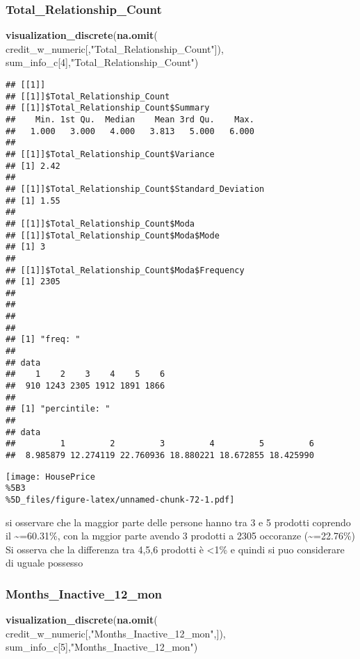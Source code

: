 \documentclass[
]{article}
\newenvironment{Shaded}{\begin{snugshade}}{\end{snugshade}}
\newcommand{\DecValTok}[1]{\textcolor[rgb]{0.00,0.00,0.81}{#1}}
\newcommand{\FunctionTok}[1]{\textcolor[rgb]{0.13,0.29,0.53}{\textbf{#1}}}
\newcommand{\NormalTok}[1]{#1}
\newcommand{\StringTok}[1]{\textcolor[rgb]{0.31,0.60,0.02}{#1}}
\begin{document}
\subsubsection{Total\_Relationship\_Count}\label{total_relationship_count}

\begin{Shaded}
\begin{Highlighting}[]
\FunctionTok{visualization\_discrete}\NormalTok{(}\FunctionTok{na.omit}\NormalTok{(}
\NormalTok{  credit\_w\_numeric[,}\StringTok{"Total\_Relationship\_Count"}\NormalTok{]), sum\_info\_c[}\DecValTok{4}\NormalTok{],}\StringTok{"Total\_Relationship\_Count"}\NormalTok{)}
\end{Highlighting}
\end{Shaded}

\begin{verbatim}
## [[1]]
## [[1]]$Total_Relationship_Count
## [[1]]$Total_Relationship_Count$Summary
##    Min. 1st Qu.  Median    Mean 3rd Qu.    Max. 
##   1.000   3.000   4.000   3.813   5.000   6.000 
## 
## [[1]]$Total_Relationship_Count$Variance
## [1] 2.42
## 
## [[1]]$Total_Relationship_Count$Standard_Deviation
## [1] 1.55
## 
## [[1]]$Total_Relationship_Count$Moda
## [[1]]$Total_Relationship_Count$Moda$Mode
## [1] 3
## 
## [[1]]$Total_Relationship_Count$Moda$Frequency
## [1] 2305
## 
## 
## 
## 
## [1] "freq: "
## 
## data
##    1    2    3    4    5    6 
##  910 1243 2305 1912 1891 1866 
## 
## [1] "percintile: "
## 
## data
##         1         2         3         4         5         6 
##  8.985879 12.274119 22.760936 18.880221 18.672855 18.425990
\end{verbatim}

\texttt{[image: HousePrice\\\%5B3\\\%5D\_files/figure-latex/unnamed-chunk-72-1.pdf]}

si osservare che la maggior parte delle persone hanno tra 3 e 5 prodotti
coprendo il \textasciitilde=60.31\%, con la mggior parte avendo 3
prodotti a 2305 occoranze (\textasciitilde=22.76\%) Si osserva che la
differenza tra 4,5,6 prodotti è \textless1\% e quindi si puo considerare
di uguale possesso

\subsubsection{Months\_Inactive\_12\_mon}\label{months_inactive_12_mon}

\begin{Shaded}
\begin{Highlighting}[]
\FunctionTok{visualization\_discrete}\NormalTok{(}\FunctionTok{na.omit}\NormalTok{(}
\NormalTok{  credit\_w\_numeric[,}\StringTok{"Months\_Inactive\_12\_mon"}\NormalTok{,]), sum\_info\_c[}\DecValTok{5}\NormalTok{],}\StringTok{"Months\_Inactive\_12\_mon"}\NormalTok{)}
\end{Highlighting}
\end{Shaded}
\end{document}
